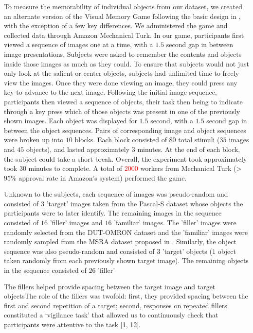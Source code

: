 To measure the memorability of individual objects from our dataset, we created an alternate version of the Visual Memory Game following the basic design in \cite{isola11}, with the exception of a few key differences. We administered the game and collected data through Amazon Mechanical Turk. In our game, participants first viewed a sequence of images one at a time, with a $1.5$ second gap in between image presentations. Subjects were asked to remember the contents and objects inside those images as much as they could. To ensure that subjects would not just only look at the salient or center objects, subjects had unlimited time to freely view the images. Once they were done viewing an image, they could press any key to advance to the next image. Following the initial image sequence, participants then viewed a sequence of objects, their task then being to indicate through a key press which of those objects was present in one of the previously shown images. Each object was displayed for $1.5$ second, with a $1.5$ second gap in between the object sequences. Pairs of corresponding image and object sequences were broken up into $10$ blocks. Each block consisted of $80$ total stimuli ($35$ images and $45$ objects), and lasted approximately $3$ minutes. At the end of each block, the subject could take a short break. Overall, the experiment took approximately took $30$ minutes to complete. A total of \textcolor{red}{$2000$} workers from Mechanical Turk (> 95\% approval rate in Amazon’s system) performed the game. 

Unknown to the subjects, each sequence of images was pseudo-random and consisted of $3$ 'target' images taken from the Pascal-S dataset whose objects the participants were to later identify. The remaining images in the sequence consisted of $16$ 'filler' images and $16$ 'familiar' images. The 'filler' images were randomly selected from the DUT-OMRON dataset \cite{dutomron13} and the 'familiar' images were randomly sampled from the MSRA dataset proposed in \cite{msra11}. Similarly, the object sequence was also pseudo-random and consisted of $3$ 'target' objects ($1$ object taken randomly from each previously shown target image). The remaining objects in the sequence consisted of $26$ 'filler' 


The fillers helped provide spacing between the target image and target objectsThe role of the fillers was twofold: first, they provided spacing between the first and second
repetition of a target; second, responses on repeated fillers constituted a ‘vigilance task’ that allowed us to continuously check that participants were attentive to the task
[1, 12].


